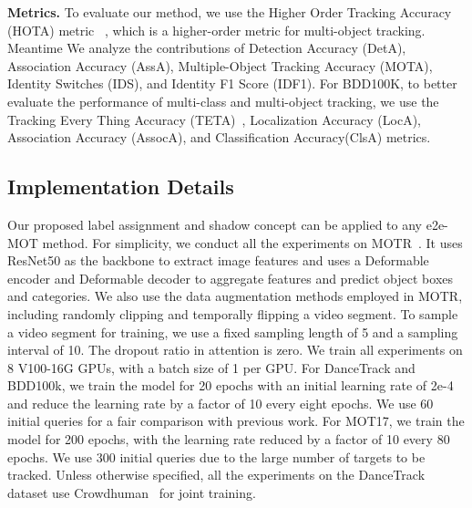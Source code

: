 \documentclass{article}
\begin{document}
\textbf{Metrics.} To evaluate our method, we use the Higher Order Tracking Accuracy (HOTA) metric ~\cite{luiten2021hota}, which is a higher-order metric for multi-object tracking. Meantime We analyze the contributions of Detection Accuracy (DetA), Association Accuracy (AssA), Multiple-Object Tracking Accuracy (MOTA), Identity Switches (IDS), and Identity F1 Score (IDF1). For BDD100K, to better evaluate the performance of multi-class and multi-object tracking, we use the Tracking Every Thing Accuracy (TETA)~\cite{li2022tracking}, Localization Accuracy (LocA), Association Accuracy (AssocA), and Classification Accuracy(ClsA) metrics. 























\subsection{Implementation Details}

Our proposed label assignment and shadow concept can be applied to any e2e-MOT method. For simplicity, we conduct all the experiments on MOTR~\cite{zeng2022motr}. It uses ResNet50 as the backbone to extract image features and uses a Deformable encoder and Deformable decoder to aggregate features and predict object boxes and categories. We also use the data augmentation methods employed in MOTR, including randomly clipping and temporally flipping a video segment. To sample a video segment for training, we use a fixed sampling length of 5 and a sampling interval of 10. The dropout ratio in attention is zero. We train all experiments on 8 V100-16G GPUs, with a batch size of 1 per GPU. For DanceTrack and BDD100k, we train the model for 20 epochs with an initial learning rate of 2e-4 and reduce the learning rate by a factor of 10 every eight epochs.  We use 60 initial queries for a fair comparison with previous work. For MOT17, we train the model for 200 epochs, with the learning rate reduced by a factor of 10 every 80 epochs.  We use 300 initial queries due to the large number of targets to be tracked. Unless otherwise specified, all the experiments on the DanceTrack dataset use Crowdhuman~\cite{shao2018crowdhuman} for joint training.
\end{document}
